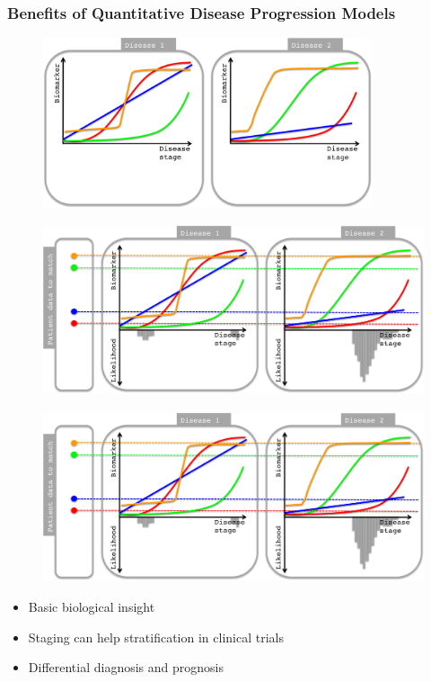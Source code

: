 \documentclass[8pt,xcolor=table,aspectratio=169]{beamer}
\begin{document}
\begin{frame}
\frametitle{Benefits of Quantitative Disease Progression Models}

\begin{overprint}
 \begin{figure}
 \centering
\includegraphics[height=5cm,trim=0 0 650 0,clip]{dpmDiffDiag1.png}
\end{figure}

 \begin{figure}
 \centering
\includegraphics[height=5cm,trim=0 0 650 0,clip]{dpmDiffDiag2.png}
\end{figure}

 \begin{figure}
 \centering
\includegraphics[height=5cm,trim=0 0 0 0,clip]{dpmDiffDiag2.png}
\end{figure}

\end{overprint}

\vspace{1em}
\begin{itemize}
  \item Basic biological insight
  \item Staging can help stratification in clinical trials
  \item Differential diagnosis and prognosis
 
\end{itemize}


 

\end{frame}
\end{document}
